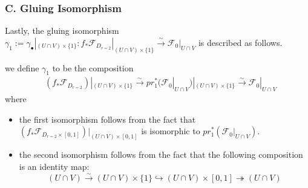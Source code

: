 \subsubsection{C. Gluing Isomorphism}
Lastly, the gluing isomorphism $\gamma_1 := \gamma_\bullet|_{(U\cap V)\times \{1\}}:  f_*\mathscr{F}_{D_{r=2}}|_{(U\cap V)\times \{1\}}\xrightarrow{\sim} \mathscr{F}_0|_{U\cap V}$ is described as follows.

\begin{definition}
we define $\gamma_1$ to be the composition
\begin{align*}
&(f_*\mathscr{F}_{D_{r=2}})|_{(U\cap V)\times \{1\}}\xrightarrow{\sim}pr_1^*(\mathscr{F}_0|_{U\cap V})|_{(U\cap V)\times \{1\}}\xrightarrow{\sim}\mathscr{F}_0|_{U\cap V}
\end{align*}
where
\begin{itemize}
\item the first isomorphism follows from the fact that $(f_*\mathscr{F}_{D_{r=2}\times [0,1]})|_{(U\cap V)\times[0,1]}$ is isomorphic to $pr_1^*(\mathscr{F}_0|_{U\cap V})$.

\item the second isomorphism follows from the fact that the following composition is an identity map:
\[
(U\cap V)\xrightarrow{\sim} (U\cap V)\times \{1\} \hookrightarrow (U\cap V)\times [0,1] \twoheadrightarrow (U\cap V)
\]
\end{itemize}
\end{definition}
\pagebreak